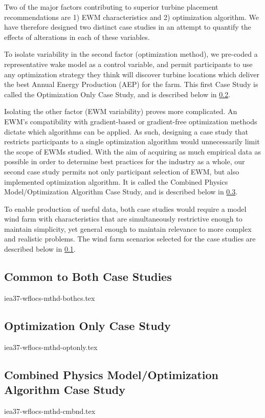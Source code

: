 			

Two of the major factors contributing to superior turbine placement recommendations are
1) EWM characteristics and 2) optimization algorithm.
We have therefore designed two distinct case studies in an attempt to quantify the effects of alterations in each of these variables.

To isolate variability in the second factor (optimization method), we pre-coded a representative wake model as a control variable,
and permit participants to use any optimization strategy they think will discover turbine locations which deliver the best Annual Energy Production (AEP) for the farm.
This first Case Study is called the Optimization Only Case Study, and is described below in \cref{sec:optonly}.

Isolating the other factor (EWM variability) proves more complicated.
An EWM's compatibility with gradient-based or gradient-free optimization methods dictate which algorithms can be applied.
As such, designing a case study that restricts participants to a single optimization algorithm would unnecessarily limit the scope of EWMs studied.
With the aim of acquiring as much empirical data as possible in order to determine best practices for the industry as a whole,
our second case study permits not only participant selection of EWM, but also implemented optimization algorithm.
It is called the Combined Physics Model/Optimization Algorithm Case Study, and is described below in \cref{sec:cmbnd}.

To enable production of useful data, both case studies would require a model wind farm with characteristics that are simultaneously restrictive enough to maintain simplicity, yet general enough to maintain relevance to more complex and realistic problems.
The wind farm scenarios selected for the case studies are described below in \cref{sec:windfarm}.
\bigskip
\subsection{Common to Both Case Studies} \label{sec:windfarm}

	{iea37-wflocs-mthd-bothcs.tex}
	
\subsection{Optimization Only Case Study} \label{sec:optonly}

	{iea37-wflocs-mthd-optonly.tex}

\subsection{Combined Physics Model/Optimization Algorithm Case Study} \label{sec:cmbnd}

	{iea37-wflocs-mthd-cmbnd.tex}